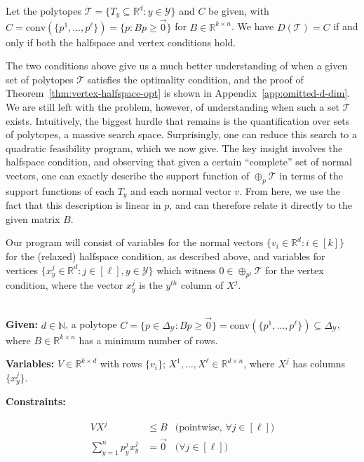 \documentclass[final]{colt2020} %
\newcommand{\reals}{\mathbb{R}}
\newcommand{\simplex}{\Delta_\Y}
\newcommand{\T}{\mathcal{T}}
\newcommand{\Y}{\mathcal{Y}}
\newcommand{\conv}{\mathrm{conv}}
\begin{document}
\begin{theorem} \label{thm:vertex-halfspace-opt}
  Let the polytopes $\T = \{T_y \subseteq \reals^d : y \in \Y\}$ and $C$ be given, with $C = \conv(\{p^1,\ldots,p^{\ell}\}) = \{p: Bp \geq \vec 0\}$ for $B \in \reals^{k \times n}$.
  We have $D(\T) = C$ if and only if both the halfspace and vertex conditions hold.
\end{theorem}

The two conditions above give us a much better understanding of when a given set of polytopes $\T$ satisfies the optimality condition, and the proof of Theorem~\ref{thm:vertex-halfspace-opt} is shown in Appendix~\ref{app:omitted-d-dim}.
We are still left with the problem, however, of understanding when such a set $\T$ exists.
Intuitively, the biggest hurdle that remains is the quantification over sets of polytopes, a massive search space.
Surprisingly, one can reduce this search to a quadratic feasibility program, which we now give.
The key insight involves the halfspace condition, and observing that given a certain ``complete'' set of normal vectors, one can exactly describe the support function of $\oplus_p\T$ in terms of the support functions of each $T_y$ and each normal vector $v$.
From here, we use the fact that this description is linear in $p$, and can therefore relate it directly to the given matrix $B$.

Our program will consist of variables for the normal vectors $\{v_i \in \reals^d : i \in [k]\}$ for the (relaxed) halfspace condition, as described above, and variables for vertices $\{x^j_y \in \reals^d : j \in [\ell], y \in \Y\}$ which witness $0\in\oplus_{p^j} \T$ for the vertex condition, where the vector $x^j_y$ is the $y^{th}$ column of $X^j$.


\begin{definition} \label{def:qfp} ~ \\
  \indent 
  \textbf{Given:} $d \in \mathbb{N}$, a polytope $C = \{p \in \simplex : Bp \geq \vec 0\} = \conv(\{p^1, \ldots, p^\ell\}) \subseteq \simplex$, where $B \in \reals^{k \times n}$ has a minimum number of rows.

  \textbf{Variables:} $V \in \reals^{k \times d}$ with rows $\{v_i\}$; $X^1,\ldots,X^{\ell} \in \reals^{d \times n}$, where $X^j$ has columns $\{x^j_y\}$.

  \textbf{Constraints:}

  \vspace{-3.2em}
    \begin{align}
      V X^j                     &\leq B    & \text{(pointwise, $\forall j \in [\ell]$)}  \label{eqn:qp-constr-1} \\
      \sum_{y=1}^n p^j_y x^j_y &= \vec 0  & \text{($\forall j \in [\ell]$)}    \label{eqn:qp-constr-2}
    \end{align}
\end{definition}
\end{document}
